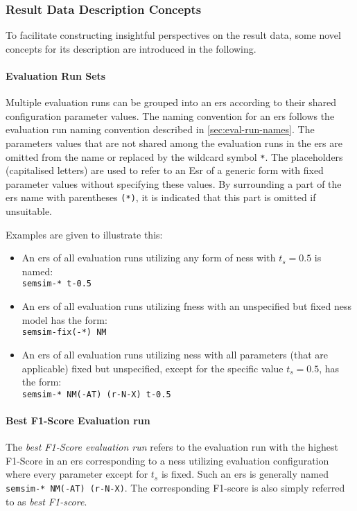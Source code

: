 \documentclass[11pt, numbers=noenddot]{scrreprt}
\begin{document}
\subsubsection{Result Data Description Concepts}
To facilitate constructing insightful perspectives on the result data, some novel concepts for its description are introduced in the following.

\paragraph{Evaluation Run Sets}
Multiple evaluation runs can be grouped into an \gls{ers} according to their shared configuration parameter values. The naming convention for an \gls{ers} follows the evaluation run naming convention described in \cref{sec:eval-run-names}. The parameters values that are not shared among the evaluation runs in the \gls{ers} are omitted from the name or replaced by the wildcard symbol \texttt{*}. The placeholders (capitalised letters) are used to refer to an E\gls{sr} of a generic form with fixed parameter values without specifying these values.  By surrounding a part of the \gls{ers} name with parentheses \texttt{(*)}, it is indicated that this part is omitted if unsuitable. 

Examples are given to illustrate this:
\begin{itemize}
	\item An \gls{ers} of all evaluation runs utilizing any form of \gls{ness} with \(t_s = 0.5\) is named: \\ \texttt{semsim-* t-0.5}
	\item An \gls{ers} of all evaluation runs utilizing \gls{fness} with an unspecified but fixed \gls{ness} model has the form: \\ \texttt{semsim-fix(-*) NM} 
	\item An \gls{ers} of all evaluation runs utilizing \gls{ness} with all parameters (that are applicable) fixed but unspecified, except for the specific value \(t_s = 0.5\), has the form: \\ \texttt{semsim-* NM(-AT) (r-N-X) t-0.5}
\end{itemize}

\paragraph{Best F1-Score Evaluation run} The \textit{best F1-Score evaluation run} refers to the evaluation run with the highest F1-Score in an \gls{ers} corresponding to a \gls{ness} utilizing evaluation configuration where every parameter except for \(t_s\) is fixed. Such an \gls{ers} is generally named \texttt{semsim-* NM(-AT) (r-N-X)}. The corresponding F1-score is also simply referred to as \textit{best F1-score}.
\end{document}
